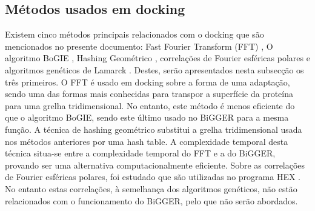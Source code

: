 \subsection{Métodos usados em docking}
Existem cinco métodos principais relacionados com o docking que são mencionados no presente documento: Fast Fourier Transform (FFT) \cite{katchalski1992}, O algoritmo BoGIE \cite{biggerPaper}, Hashing Geométrico \cite{geometry}, correlações de Fourier esféricas polares \cite{ritchiew} e algoritmos genéticos de Lamarck \cite{morris1998automated}. Destes, serão apresentados nesta subsecção os três primeiros. O FFT é usado em docking sobre a forma de uma adaptação, sendo uma das formas mais conhecidas para transpor a superfície da proteína para uma grelha tridimensional. No entanto, este método é menos eficiente do que o algoritmo BoGIE, sendo este último usado no BiGGER para a mesma função. A técnica de hashing geométrico substitui a grelha tridimensional usada nos métodos anteriores por uma hash table. A complexidade temporal desta técnica situa-se entre a complexidade temporal do FFT e a do BiGGER, provando ser uma alternativa computacionalmente eficiente. Sobre as correlações de Fourier esféricas polares, foi estudado que são utilizadas no programa HEX \cite{ritchiew}. No entanto estas correlações, à semelhança dos algoritmos genéticos, não estão relacionados com o funcionamento do BiGGER, pelo que não serão abordados.
